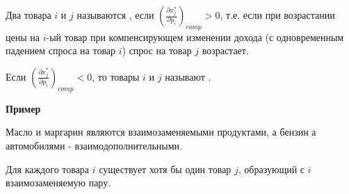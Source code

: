 \begin{definition}\label{cha:3/def:4}
	Два товара $i$ и $j$ называются , если $\left(\frac{\partial x_j^{*}}{\partial p_i}\right)_{comp} > 0$, т.е. если при возрастании цены на $i$-ый товар при компенсирующем изменении дохода (с одновременным падением спроса на товар $i$) спрос на товар $j$ возрастает. 

	Если $\left(\frac{\partial x_j^{*}}{\partial p_i}\right)_{comp} < 0$, то товары $i$ и $j$ называют .
\end{definition}

\textbf{Пример}

Масло и маргарин являются взаимозаменяемыми продуктами, а бензин а автомобилями - взаимодополнительными.

\begin{conseq}[]\label{cha:3/conseq:4}
	Для каждого товара $i$ существует хотя бы один товар $j$, образующий с $i$ взаимозаменяемую пару.
\end{conseq}
















